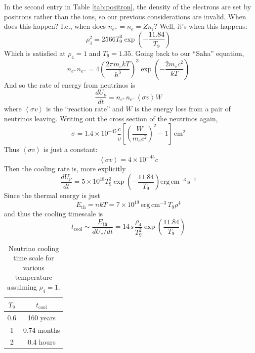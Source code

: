 \documentclass[10pt]{article}
\numberwithin{equation}{section}
\newcommand{\n}{\noindent}
\newcommand{\avg}[1]{\left\langle#1\right\rangle}
\begin{document}
    \n In the second entry in Table \ref{tab:positron}, the density of
    the electrons are set by positrons rather than the ions, so our
    previous considerations are invalid. When does this happen?
    I.e., when does $n_{e^+}=n_e=Zn_i$? Well, it's when this
    happens:
    \begin{equation}
      \label{eq:348}
      \rho_4^2=2566 T_9^3\exp\left(-\frac{11.84}{T_9}\right)
    \end{equation}
    Which is satisfied at $\rho_4=1$ and $T_9=1.35$. Going back to
    our ``Saha'' equation, 
    \begin{equation}
      \label{eq:349}
      n_{e^+}n_{e^-}=4\left(\frac{2\pi m_e kT}{h^3}\right)^3\exp\left(-
\frac{2m_ec^2}{kT}\right)
    \end{equation}
    And so the rate of energy from neutrinos is
    \begin{equation}
      \label{eq:350}
      \frac{dU_\nu}{dt}=n_{e^+}n_{e^-}\avg{\sigma v}W
    \end{equation}
    where $\avg{\sigma v}$ is the ``reaction rate'' and $W$ is the
    energy loss from a pair of neutrinos leaving. Writing out the
    cross section of the neutrinos again,
    \begin{equation}
      \label{eq:351}
      \sigma = 1.4\times 10^{-45}\frac{c}{v}\left[\left(\frac{W}
{m_ec^2}\right)^2-1\right]\,\mathrm{cm^2}
    \end{equation}
    Thus $\avg{\sigma v}$ is just a constant:
    \begin{equation}
      \label{eq:352}
      \avg{\sigma v}=4\times 10^{-45}c
    \end{equation}
    Then the cooling rate is, more explicitly
    \begin{equation}
      \label{eq:353}
      \frac{dU_\nu}{dt}=5\times 10^{18}T_9^3\exp\left(-\frac{11.84}
{T_9}\right)\mathrm{erg\,cm^{-3}\,s^{-1}}
    \end{equation}
    Since the thermal energy is just
    \begin{equation}
      \label{eq:354}
      E_{\mathrm{th}}=nkT=7\times 10^{19}\,\mathrm{erg\,cm^{-3}}\,T_9\rho^4
    \end{equation}
    and thus the cooling timescale is
    \begin{equation}
      \label{eq:355}
      t_{\mathrm{cool}}\sim\frac{E_{\mathrm{th}}}{dU_\nu/dt}=14\,\mathrm{s}
\,\frac{\rho_4}{T_9^2}\exp\left(\frac{11.84}{T_9}\right)
    \end{equation}
    \begin{table}[h]
      \centering
      \begin{tabular}{c c}
        $T_9$ & $t_{\mathrm{cool}}$\\
        \hline \hline
        0.6 & 160 years\\
        1 & 0.74 months\\
        2 & 0.4 hours
      \end{tabular}
      \caption{Neutrino cooling time scale for various temperature 
assuiming $\rho_4=1$.}
      \label{tab:cooling}
    \end{table}
\end{document}
